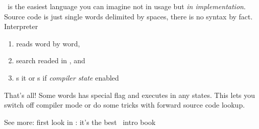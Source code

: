 \clearpage\secrel{\F}\label{whyFORTH}

\F\ is the easiest language you can imagine not in usage but \emph{in
implementation}. Source code is just single words delimited by spaces, there is
no syntax by fact.
% 
Interpreter
\begin{enumerate}[nosep]
  \item reads  word by word,
  \item search readed  in , and
  \item {}s it or s if \textit{compiler state} enabled
\end{enumerate}

\noindent
That's all! Some words has special  flag and executes in any states.
This lets you switch off compiler mode or do some tricks with forward source
code lookup.

\bigskip\noindent
See more: first look in \cite{kelly,kellyru}: it's the best \F\ intro book 
